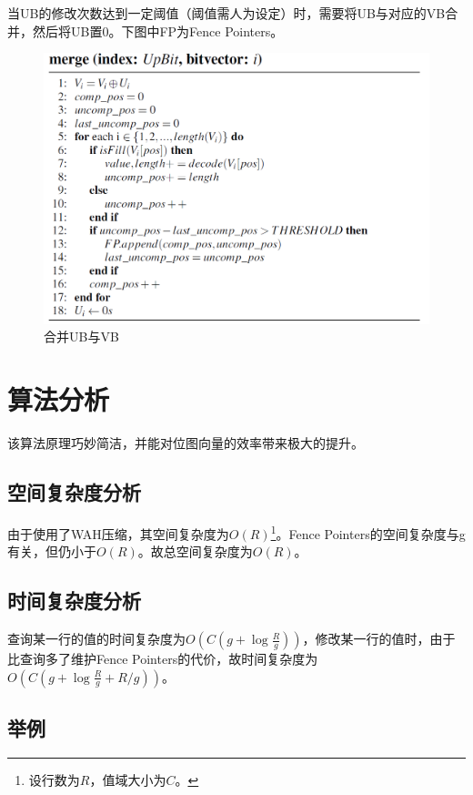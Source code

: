 \documentclass[11pt, a4paper]{article}
\begin{document}
  当UB的修改次数达到一定阈值（阈值需人为设定）时，需要将UB与对应的VB合并，然后将UB置0。下图中FP为Fence Pointers。

  \begin{figure}[H]
    \begin{center}
      \includegraphics[width=5in]{merge.png}
      \caption{合并UB与VB}
      \label{fig:merge}
    \end{center}
  \end{figure}

  \section{算法分析}

  该算法原理巧妙简洁，并能对位图向量的效率带来极大的提升。

  \subsection{空间复杂度分析}

  由于使用了WAH压缩，其空间复杂度为$O(R)$\footnote{设行数为$R$，值域大小为$C$。}。Fence Pointers的空间复杂度与g有关，但仍小于$O(R)$。故总空间复杂度为$O(R)$。

  \subsection{时间复杂度分析}

  查询某一行的值的时间复杂度为$O(C(g + \log \frac{R}{g}))$，修改某一行的值时，由于比查询多了维护Fence Pointers的代价，故时间复杂度为$O(C(g + \log \frac{R}{g} + R/g))$。

  \subsection{举例}
\end{document}
